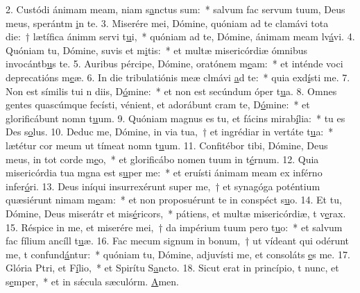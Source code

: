 2. Custódi ánimam meam, niam s\uline{a}nctus sum:~* salvum fac servum tuum, Deus meus, sperántm \uline{i}n te.
3. Miserére mei, Dómine, quóniam ad te clamávi tota die:~† lætífica ánimm servi t\uline{u}i,~* quóniam ad te, Dómine, ánimam meam lv\uline{á}vi.
4. Quóniam tu, Dómine, suvis et m\uline{i}tis:~* et multæ misericórdiæ ómnibus invocántb\uline{u}s te.
5. Auribus pércipe, Dómine, oratónem m\uline{e}am:~* et inténde voci deprecatións m\uline{e}æ.
6. In die tribulatiónis meæ clmávi \uline{a}d te:~* quia exd\uline{í}sti me.
7. Non est símilis tui n diis, D\uline{ó}mine:~* et non est secúndum óper t\uline{u}a.
8. Omnes gentes quascúmque fecísti, vénient, et adorábunt cram te, D\uline{ó}mine:~* et glorificábunt nomn t\uline{u}um.
9. Quóniam magnus es tu, et fácins mirab\uline{í}lia:~* tu es Des s\uline{o}lus.
10. Deduc me, Dómine, in via tua,~† et ingrédiar in vertáte t\uline{u}a:~* lætétur cor meum ut tímeat nomn t\uline{u}um.
11. Confitébor tibi, Dómine, Deus meus, in tot corde m\uline{e}o,~* et glorificábo nomen tuum in t\uline{é}rnum.
12. Quia misericórdia tua mgna est s\uline{u}per me:~* et eruísti ánimam meam ex inférno infer\uline{ó}ri.
13. Deus iníqui insurrexérunt super me,~† et synagóga poténtium quæsiérunt nimam m\uline{e}am:~* et non proposuérunt te in conspéct s\uline{u}o.
14. Et tu, Dómine, Deus miserátr et mis\uline{é}ricors,~* pátiens, et multæ misericórdiæ, t v\uline{e}rax.
15. Réspice in me, et miserére mei,~† da impérium tuum pero t\uline{u}o:~* et salvum fac fílium ancíll t\uline{u}æ.
16. Fac mecum signum in bonum,~† ut vídeant qui odérunt me, t confund\uline{á}ntur:~* quóniam tu, Dómine, adjuvísti me, et consoláts \uline{e}s me.
17. Glória Ptri, et F\uline{í}lio,~* et Spirítu S\uline{a}ncto.
18. Sicut erat in princípio, t nunc, et s\uline{e}mper,~* et in sǽcula sæculórm. \uline{A}men.
